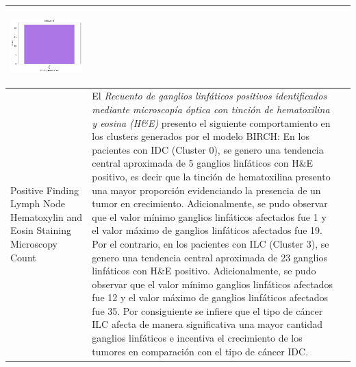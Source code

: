 \begin{table}[htb!]
\begin{threeparttable}
\begin{tabular}{p{2.5cm} p{7cm} p{6.5cm}}
			\begin{center}\includegraphics[width=1\linewidth]{NOTEBOOK/IMAGENES_BIRCH_CLUSTERING/6_Cluster_3_lymph_presentation}\end{center}
			
			\\ \hline
			Positive Finding Lymph Node Hematoxylin and Eosin Staining Microscopy Count
			& El \textit{Recuento de ganglios linfáticos positivos identificados mediante microscopía óptica con tinción de hematoxilina y eosina (H\&E)} presento el siguiente comportamiento en los clusters generados por el modelo BIRCH: En los pacientes con IDC (Cluster 0), se genero una tendencia central aproximada de 5 ganglios linfáticos con H\&E positivo, es decir que la tinción de hematoxilina presento una mayor proporción evidenciando la presencia de un tumor en crecimiento. Adicionalmente, se pudo observar que  el valor mínimo ganglios linfáticos afectados fue 1 y el valor máximo de ganglios linfáticos afectados fue 19. Por el contrario, en los pacientes con ILC (Cluster 3), se genero una tendencia central aproximada de 23 ganglios linfáticos con H\&E positivo. Adicionalmente, se pudo observar que el valor mínimo ganglios linfáticos afectados fue 12 y el valor máximo de ganglios linfáticos afectados fue 35. Por consiguiente se infiere que el tipo de cáncer ILC afecta de manera significativa una mayor cantidad ganglios linfáticos e incentiva el crecimiento de los tumores en comparación con el tipo de cáncer IDC.
			

\end{tabular}
\end{threeparttable}
\end{table}
